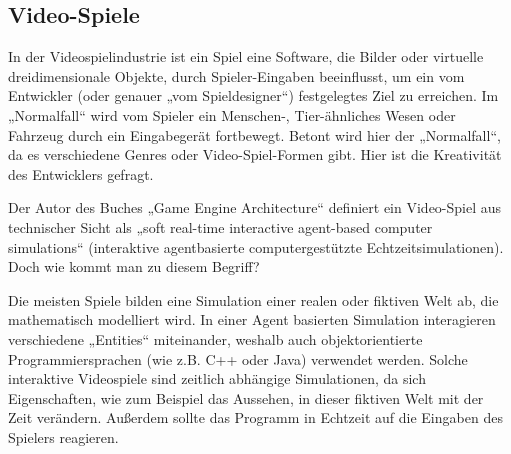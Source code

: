 \subsection{Video-Spiele}

In der Videospielindustrie ist ein Spiel eine Software, die Bilder oder virtuelle dreidimensionale Objekte, durch Spieler-Eingaben beeinflusst, um ein vom Entwickler (oder genauer „vom Spieldesigner“) festgelegtes Ziel zu erreichen. 
Im „Normalfall“ wird vom Spieler ein Menschen-, Tier-ähnliches Wesen oder Fahrzeug durch ein Eingabegerät fortbewegt. Betont wird hier der „Normalfall“, da es verschiedene Genres oder Video-Spiel-Formen gibt. Hier ist die Kreativität des Entwicklers gefragt.

Der Autor des Buches „Game Engine Architecture“ \cite{gea} definiert ein Video-Spiel aus technischer Sicht als „soft real-time interactive agent-based computer simulations“ (interaktive agentbasierte computergestützte Echtzeitsimulationen).
Doch wie kommt man zu diesem Begriff?

Die meisten Spiele bilden eine Simulation einer realen oder fiktiven Welt ab, die mathematisch modelliert wird. In einer Agent basierten Simulation interagieren verschiedene „Entities“ miteinander, weshalb auch objektorientierte Programmiersprachen (wie z.B. C++ oder Java) verwendet werden.
Solche interaktive Videospiele sind zeitlich abhängige Simulationen, da sich Eigenschaften, wie zum Beispiel das Aussehen, in dieser fiktiven Welt mit der Zeit verändern. Außerdem sollte das Programm in Echtzeit auf die Eingaben des Spielers reagieren.
